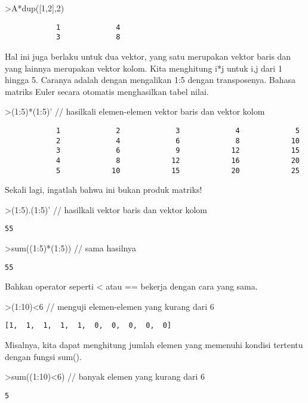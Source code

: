 \documentclass[
]{book}
\begin{document}
\textgreater A*dup({[}1,2{]},2)

\begin{verbatim}
            1             4 
            3             8 
\end{verbatim}

Hal ini juga berlaku untuk dua vektor, yang satu merupakan vektor baris dan yang lainnya merupakan vektor kolom. Kita menghitung i*j untuk i,j dari 1 hingga 5. Caranya adalah dengan mengalikan 1:5 dengan transposenya. Bahasa matriks Euler secara otomatis menghasilkan tabel nilai.

\textgreater(1:5)*(1:5)' // hasilkali elemen-elemen vektor baris dan vektor kolom

\begin{verbatim}
            1             2             3             4             5 
            2             4             6             8            10 
            3             6             9            12            15 
            4             8            12            16            20 
            5            10            15            20            25 
\end{verbatim}

Sekali lagi, ingatlah bahwa ini bukan produk matriks!

\textgreater(1:5).(1:5)' // hasilkali vektor baris dan vektor kolom

\begin{verbatim}
55
\end{verbatim}

\textgreater sum((1:5)*(1:5)) // sama hasilnya

\begin{verbatim}
55
\end{verbatim}

Bahkan operator seperti \textless{} atau == bekerja dengan cara yang sama.

\textgreater(1:10)\textless6 // menguji elemen-elemen yang kurang dari 6

\begin{verbatim}
[1,  1,  1,  1,  1,  0,  0,  0,  0,  0]
\end{verbatim}

Misalnya, kita dapat menghitung jumlah elemen yang memenuhi kondisi tertentu dengan fungsi sum().

\textgreater sum((1:10)\textless6) // banyak elemen yang kurang dari 6

\begin{verbatim}
5
\end{verbatim}
\end{document}
